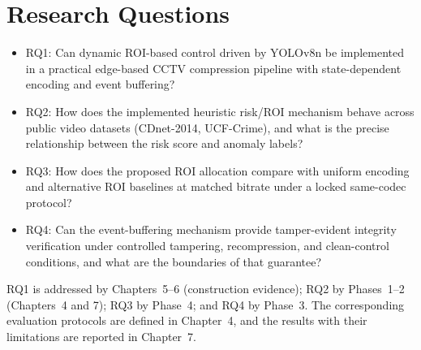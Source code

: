 \section{Research Questions}

\begin{itemize}
\item RQ1: Can dynamic ROI-based control driven by YOLOv8n be implemented in a practical edge-based CCTV compression pipeline with state-dependent encoding and event buffering?
\item RQ2: How does the implemented heuristic risk/ROI mechanism behave across public video datasets (CDnet-2014, UCF-Crime), and what is the precise relationship between the risk score and anomaly labels?
\item RQ3: How does the proposed ROI allocation compare with uniform encoding and alternative ROI baselines at matched bitrate under a locked same-codec protocol?
\item RQ4: Can the event-buffering mechanism provide tamper-evident integrity verification under controlled tampering, recompression, and clean-control conditions, and what are the boundaries of that guarantee?
\end{itemize}

RQ1 is addressed by Chapters~5--6 (construction evidence); RQ2 by Phases~1--2 (Chapters~4 and 7); RQ3 by Phase~4; and RQ4 by Phase~3. The corresponding evaluation protocols are defined in Chapter~4, and the results with their limitations are reported in Chapter~7.
